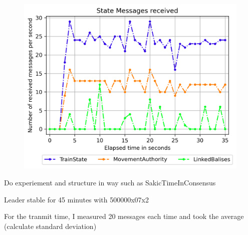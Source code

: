 \begin{figure}[!hb]
	\centering
	\includegraphics[width=0.75\linewidth]{images/plots/StateMessagesReceive}
	\caption{}
	\label{fig:PlotStateMessagesReceive}
\end{figure}


Do experiement and structure in way such as SakicTimeInConsensus

Leader stable for 45 minutes with 500000x07x2

For the tranmit time, I measured 20 messages each time and took the average (calculate standard deviation)
\fi

